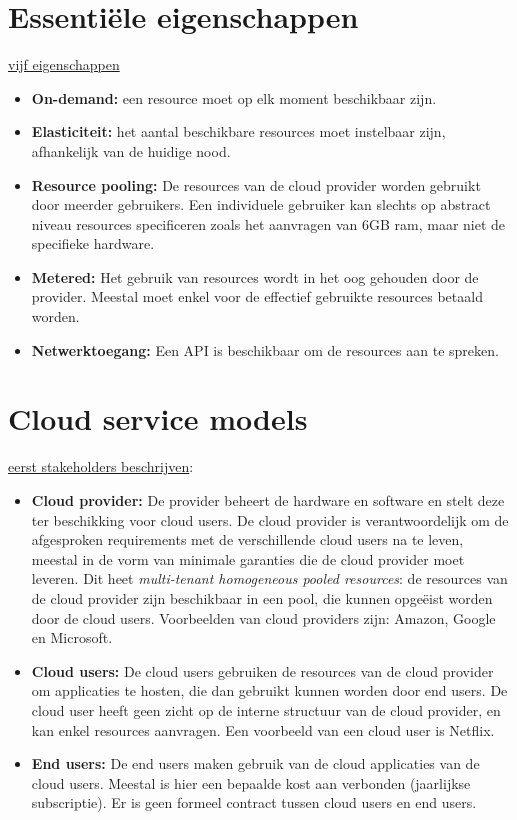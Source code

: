 	\section{Essentiële eigenschappen}
	\underline{vijf eigenschappen}
	\begin{itemize}
		\item  \textbf{On-demand:} een resource moet op elk moment beschikbaar zijn.
		\item  \textbf{Elasticiteit:} het aantal beschikbare resources moet instelbaar zijn, afhankelijk van de huidige nood.
		\item  \textbf{Resource pooling:} De resources van de cloud provider worden gebruikt door meerder gebruikers. Een individuele gebruiker kan slechts op abstract niveau resources specificeren zoals het aanvragen van 6GB ram, maar niet de specifieke hardware.
		\item  \textbf{Metered:} Het gebruik van resources wordt in het oog gehouden door de provider. Meestal moet enkel voor de effectief gebruikte resources betaald worden.
		\item  \textbf{Netwerktoegang:} Een API is beschikbaar om de resources aan te spreken.
	\end{itemize}
	\section{Cloud service models}
	\underline{eerst stakeholders beschrijven}:
	\begin{itemize}
		\item  \textbf{Cloud provider:} De provider beheert de hardware en software en stelt deze ter beschikking voor cloud users. De cloud provider is verantwoordelijk om de afgesproken requirements met de verschillende cloud users na te leven, meestal in de vorm van minimale garanties die de cloud provider moet leveren. Dit heet \emph{multi-tenant homogeneous pooled resources}: de resources van de cloud provider zijn beschikbaar in een pool, die kunnen opgeëist worden door de cloud users. Voorbeelden van cloud providers zijn: Amazon, Google en Microsoft.
		\item  \textbf{Cloud users:} De cloud users gebruiken de resources van de cloud provider om applicaties te hosten, die dan gebruikt kunnen worden door end users. De cloud user heeft geen zicht op de interne structuur van de cloud provider, en kan enkel resources aanvragen. Een voorbeeld van een cloud user is Netflix.
		\item  \textbf{End users:} De end users maken gebruik van de cloud applicaties van de cloud users. Meestal is hier een bepaalde kost aan verbonden (jaarlijkse subscriptie). Er is geen formeel contract tussen cloud users en end users. 
	\end{itemize}

